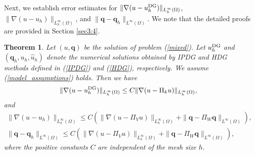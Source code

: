 \documentclass[1996/10/24]{amsart}
\newtheorem{theorem}{Theorem}[section]
\theoremstyle{definition}
\numberwithin{equation}{section}
\begin{document}
Next, we establish error estimates for $\|\nabla(u-u_h^{{\rm DG}})\|_{L_h^{\infty}(\Omega)}$, $\|\nabla(u-u_h)\|_{L_h^{\infty}(\Omega)}$, and $\|{\bm q}-{\bm q}_h\|_{L^{\infty}(\Omega)}$. We note that the detailed proofs are provided in Section \ref{sec3:4}.

\begin{theorem}\label{mn-g}
Let $(u,{\bm q})$ be the solution of problem (\ref{mixed}). Let $u_h^{{\rm DG}}$ and $({\bm q}_h,u_h,\widehat{u}_h)$ denote the
numerical solutions obtained by IPDG and HDG methods defined in (\ref{IPDG}) and (\ref{HDG}), respectively. We assume (\ref{model_assumptions})
holds. Then we have
\begin{align}
\|\nabla(u-u_h^{{\rm DG}})\|_{L^{\infty}_h(\Omega)}\leq C\|\nabla(u-\Pi_ku)\|_{L_h^{\infty}(\Omega)},
\end{align}
and
\begin{subequations}
\begin{align}
\|\nabla(u-u_h)\|_{L_h^{\infty}(\Omega)}\leq C\left(\|\nabla(u-\Pi_Vu)\|_{L_h^{\infty}(\Omega)}
+\|{\bm q}-\Pi_W{\bm q}\|_{L^{\infty}(\Omega)}\right),\\
\|{\bm q}-{\bm q}_h\|_{L^{\infty}(\Omega)}\leq C\left(\|\nabla(u-\Pi_Vu)\|_{L_h^{\infty}(\Omega)}
+\|{\bm q}-\Pi_W{\bm q}\|_{L^{\infty}(\Omega)}\right),\label{mn-g:3}
\end{align}
\end{subequations}
where the positive constants $C$ are independent of the mesh size $h$.
\end{theorem}
\end{document}
